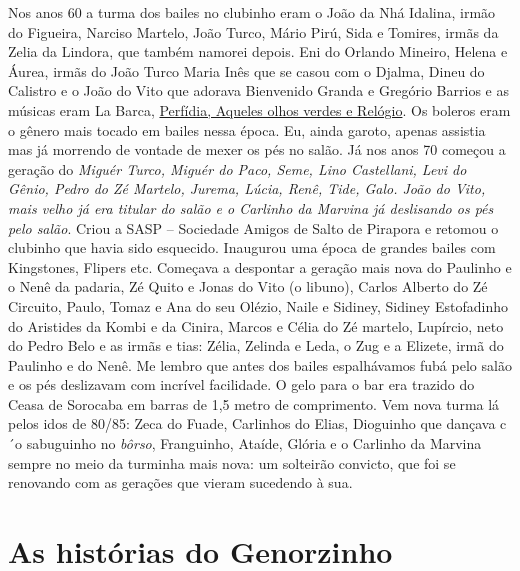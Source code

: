 \documentclass[12pt,brazil,]{book}
\begin{document}
Nos anos 60 a turma dos bailes no clubinho eram o João da Nhá Idalina,
irmão do Figueira, Narciso Martelo, João Turco, Mário Pirú, Sida e
Tomires, irmãs da Zelia da Lindora, que também namorei depois. Eni do
Orlando Mineiro, Helena e Áurea, irmãs do João Turco Maria Inês que se
casou com o Djalma, Dineu do Calistro e o João do Vito que adorava
Bienvenido Granda e Gregório Barrios e as músicas eram La Barca,
\href{https://www.youtube.com/watch?v=ceMTq1AS7Qs\&list=PLUu3jf3Dq_v9ZzFETDLGGFBcgOhEQkD-a\&index=220}{Perfídia,
Aqueles olhos verdes e Relógio}. Os boleros eram o gênero mais tocado em
bailes nessa época. Eu, ainda garoto, apenas assistia mas já morrendo de
vontade de mexer os pés no salão. Já nos anos 70 começou a geração do
\emph{Miguér Turco, Miguér do Paco, Seme, Lino Castellani, Levi do
Gênio, Pedro do Zé Martelo, Jurema, Lúcia, Renê, Tide, Galo. João do
Vito, mais velho já era titular do salão e o Carlinho da Marvina já
deslisando os pés pelo salão}. Criou a SASP -- Sociedade Amigos de Salto
de Pirapora e retomou o clubinho que havia sido esquecido. Inaugurou uma
época de grandes bailes com Kingstones, Flipers etc. Começava a
despontar a geração mais nova do Paulinho e o Nenê da padaria, Zé Quito
e Jonas do Vito (o libuno), Carlos Alberto do Zé Circuito, Paulo, Tomaz
e Ana do seu Olézio, Naile e Sidiney, Sidiney Estofadinho do Aristides
da Kombi e da Cinira, Marcos e Célia do Zé martelo, Lupírcio, neto do
Pedro Belo e as irmãs e tias: Zélia, Zelinda e Leda, o Zug e a Elizete,
irmã do Paulinho e do Nenê. Me lembro que antes dos bailes espalhávamos
fubá pelo salão e os pés deslizavam com incrível facilidade. O gelo para
o bar era trazido do Ceasa de Sorocaba em barras de 1,5 metro de
comprimento. Vem nova turma lá pelos idos de 80/85: Zeca do Fuade,
Carlinhos do Elias, Dioguinho que dançava c´o sabuguinho no
\emph{bôrso}, Franguinho, Ataíde, Glória e o Carlinho da Marvina sempre
no meio da turminha mais nova: um solteirão convicto, que foi se
renovando com as gerações que vieram sucedendo à sua.

\section{As histórias do
Genorzinho}\label{as-histuxf3rias-do-genorzinho}
\end{document}
